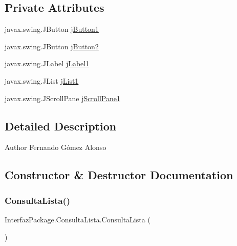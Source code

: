 \subsection*{Private Attributes}
\begin{DoxyCompactItemize}
\item 
javax.\+swing.\+J\+Button \mbox{\hyperlink{class_interfaz_package_1_1_consulta_lista_a3634a8b3f65730375cb85b196872cb4f}{j\+Button1}}
\item 
javax.\+swing.\+J\+Button \mbox{\hyperlink{class_interfaz_package_1_1_consulta_lista_a4ce758269cf41492829b3602f2d0f5ab}{j\+Button2}}
\item 
javax.\+swing.\+J\+Label \mbox{\hyperlink{class_interfaz_package_1_1_consulta_lista_a7cebe66cb1ff10204773f2c72f76b7f3}{j\+Label1}}
\item 
javax.\+swing.\+J\+List \mbox{\hyperlink{class_interfaz_package_1_1_consulta_lista_af64dea173f739368a8fe9049edfdd9f0}{j\+List1}}
\item 
javax.\+swing.\+J\+Scroll\+Pane \mbox{\hyperlink{class_interfaz_package_1_1_consulta_lista_a8b791a3cb8f0a4494b0e06d5b08fe9ad}{j\+Scroll\+Pane1}}
\end{DoxyCompactItemize}


\subsection{Detailed Description}
\begin{DoxyAuthor}{Author}
Fernando Gómez Alonso 
\end{DoxyAuthor}


\subsection{Constructor \& Destructor Documentation}
\mbox{\label{class_interfaz_package_1_1_consulta_lista_ae50be7402a33e7d40901ce450fe3d95b}} 
\subsubsection{\texorpdfstring{Consulta\+Lista()}{ConsultaLista()}}
{\footnotesize\ttfamily Interfaz\+Package.\+Consulta\+Lista.\+Consulta\+Lista (\begin{DoxyParamCaption}{ }\end{DoxyParamCaption})\hspace{0.3cm}{\ttfamily [inline]}}

